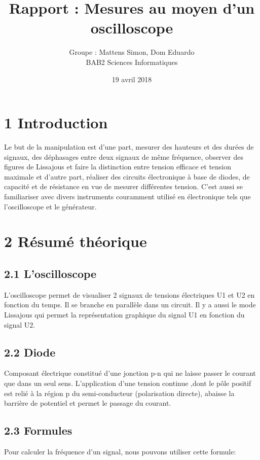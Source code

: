 \documentclass{report}
\author{Groupe : Mattens Simon, Dom Eduardo \\ BAB2 Sciences Informatiques}
\title{Rapport : Mesures au moyen d'un oscilloscope}
\date{19 avril 2018}
\makeatletter
\def\maketitle{%
  \null
  \thispagestyle{empty}%
  \vfill
  \begin{center}\leavevmode
    \normalfont
    {\LARGE \@title\par}%
    \vskip 1cm
    {\Large \@author\par}%
    \vskip 1cm
    {\Large \@date\par}%
  \end{center}%
  \vfill
  \null
  \newpage
  }
\makeatother
\begin{document}
\maketitle

\section*{1 Introduction}
\hspace*{0.5cm}
Le but de la manipulation est 
d'une part, mesurer des hauteurs et des dur\'ees de signaux, des d\'ephasages entre deux signaux de m\^eme fr\'equence, observer des figures de Lissajous et faire la distinction entre tension efficace et tension maximale et d'autre part, r\'ealiser des circuits \'electronique \`a base de diodes, de capacit\'e et de r\'esistance en vue de mesurer diff\'erentes tension. C'est aussi se familiariser avec divers instruments couramment utilis\'e en \'electronique tels que l'oscilloscope et le g\'en\'erateur.

\section*{2 R\'esum\'e th\'eorique}
\subsection*{2.1 L'oscilloscope}
\hspace*{0.5cm}
L'oscilloscope permet de visualiser 2 signaux de tensions \'electriques U1 et U2 en fonction du temps. Il se branche en parall\`ele dans un circuit. Il y a aussi le mode Lissajous qui permet la repr\'esentation graphique du signal U1 en fonction du signal U2.
\subsection*{2.2 Diode}
\hspace*{0.5cm}
Composant \'electrique constitu\'e d'une jonction p-n qui ne laisse passer le courant que dans un seul sens. L'application d'une tension continue ,dont le p\^ole positif est reli\'e \`a la r\'egion p du semi-conducteur (polarisation directe), abaisse la barri\`ere de potentiel et permet le passage du courant.
\subsection*{2.3 Formules}
\hspace*{0.5cm}
Pour calculer la fr\'equence d'un signal, nous pouvons utiliser cette formule:
\end{document}
